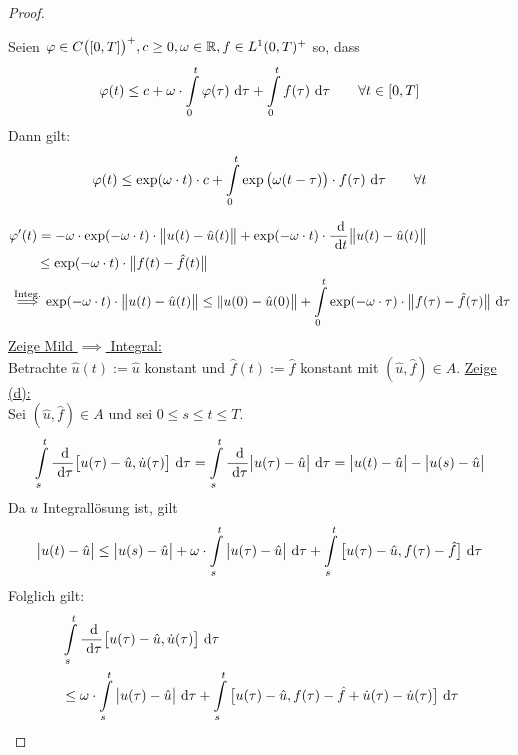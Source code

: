 \begin{proof}
\begin{lemma}[Gronwall]\label{lemmaGronwall}\enter
Seien $\varphi\in C\big([0,T]\big)^+,c\geq 0,\omega\in\mathbb{R},f\in L^1(0,T)^+$ so, dass
\begin{align*}
\varphi(t)\leq c+\omega\cdot\int\limits_0^t\varphi(\tau)\text{ d}\tau+\int\limits_0^t f(\tau)\text{ d}\tau\qquad\forall t\in[0,T]
\end{align*}
Dann gilt:
\begin{align*}
\varphi(t)\leq\exp(\omega\cdot t)\cdot c+\int\limits_0^t\exp\big(\omega(t-\tau)\big)\cdot f(\tau)\text{ d}\tau\qquad\forall t
\end{align*}
\end{lemma}
\begin{align*}
&\varphi'(t)=-\omega\cdot\exp(-\omega\cdot t)\cdot\big\Vert u(t)-\hat{u}(t)\big\Vert
+\exp(-\omega\cdot t)\cdot\frac{\text{ d}}{\text{ d} t}\big\Vert u(t)-\hat{u}(t)\big\Vert\\
&\qquad\stackrel{}{\leq}
\exp(-\omega\cdot t)\cdot\big\Vert f(t)-\hat{f}(t)\big\Vert\\
&\stackrel{\text{Integ.}}{\implies}
\exp(-\omega\cdot t)\cdot\big\Vert u(t)-\hat{u}(t)\big\Vert
\leq\Vert u(0)-\hat{u}(0)\big\Vert+\int\limits_0^t\exp(-\omega\cdot\tau)\cdot\big\Vert f(\tau)-\hat{f}(\tau)\big\Vert\text{ d}\tau
\end{align*}
\underline{Zeige Mild $\implies$ Integral:}\\
Betrachte $\hat{u}(t):=\hat{u}$ konstant und $\hat{f}(t):=\hat{f}$ konstant mit $(\hat{u},\hat{f})\in A$.\nl 
\underline{Zeige (d):}\\
Sei $(\hat{u},\hat{f})\in A$ und sei $0\leq s\leq t\leq T$.
\begin{align*}
\int\limits_s^t\frac{\text{ d}}{\text{ d}\tau}\big[u(\tau)-\hat{u},\dot{u}(\tau)\big]\text{ d}\tau
=\int\limits_s^t\frac{\text{ d}}{\text{ d}\tau}\big|u(\tau)-\hat{u}\big|\text{ d}\tau
=\big|u(t)-\hat{u}\big|-\big|u(s)-\hat{u}\big|
\end{align*}
Da $u$ Integrallösung ist, gilt
\begin{align*}
\big|u(t)-\hat{u}\big|\leq\big| u(s)-\hat{u}\big|+\omega\cdot \int\limits_s^t\big|u(\tau)-\hat{u}\big|\text{ d}\tau+\int\limits_s^t\big[u(\tau)-\hat{u},f(\tau)-\hat{f}\big]\text{ d}\tau
\end{align*}
Folglich gilt:
\begin{align*}
&\int\limits_s^t\frac{\d}{\d\tau}\big[u(\tau)-\hat{u},\dot{u}(\tau)\big]\d\tau\\
&\leq\omega\cdot\int\limits_s^t\big|u(\tau)-\hat{u}\big|\d\tau+\int\limits_s^t\big[u(\tau)-\hat{u},f(\tau)-\hat{f}+\dot{u}(\tau)-\dot{u}(\tau)\big]\d\tau\\

\end{align*}
\end{proof}
